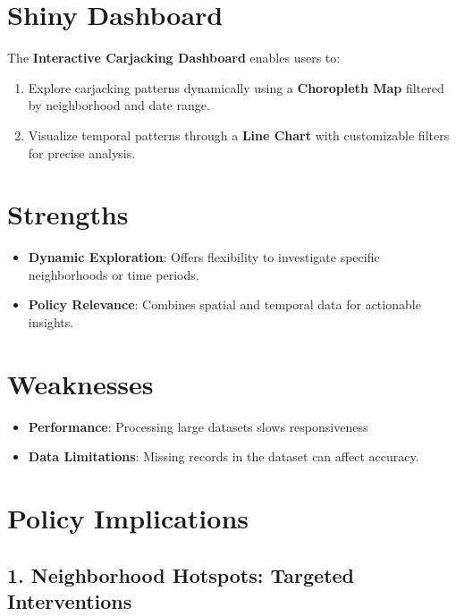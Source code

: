 \documentclass[
  9pt,
  letterpaper,
  DIV=11,
  numbers=noendperiod]{scrartcl}
\providecommand{\tightlist}{%
  \setlength{\itemsep}{0pt}\setlength{\parskip}{0pt}}\usepackage{longtable,booktabs,array}
\begin{document}
\section{Shiny Dashboard}\label{shiny-dashboard}

The \textbf{Interactive Carjacking Dashboard} enables users to:

\begin{enumerate}
\def\labelenumi{\arabic{enumi}.}
\tightlist
\item
  Explore carjacking patterns dynamically using a \textbf{Choropleth
  Map} filtered by neighborhood and date range.
\item
  Visualize temporal patterns through a \textbf{Line Chart} with
  customizable filters for precise analysis.
\end{enumerate}

\section{Strengths}\label{strengths}

\begin{itemize}
\tightlist
\item
  \textbf{Dynamic Exploration}: Offers flexibility to investigate
  specific neighborhoods or time periods.
\item
  \textbf{Policy Relevance}: Combines spatial and temporal data for
  actionable insights.
\end{itemize}

\section{Weaknesses}\label{weaknesses}

\begin{itemize}
\tightlist
\item
  \textbf{Performance}: Processing large datasets slows responsiveness
\item
  \textbf{Data Limitations}: Missing records in the dataset can affect
  accuracy.
\end{itemize}

\section{Policy Implications}\label{policy-implications}

\subsection{1. Neighborhood Hotspots: Targeted
Interventions}\label{neighborhood-hotspots-targeted-interventions}
\end{document}
